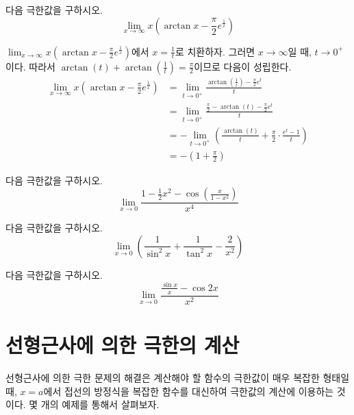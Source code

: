 \documentclass[11pt, a4paper]{book}
\begin{document}
\begin{example}
	 다음 극한값을 구하시오.
	\begin{equation*}
		\displaystyle\lim_{x\to \infty}x\left(\arctan x -\frac{\pi}{2}e^{\frac{1}{x}}\right)
	\end{equation*}
\begin{solution}
	$\displaystyle\lim_{x \to \infty}x\left(\arctan x -\frac{\pi}{2}e^{\frac{1}{x}}\right)$에서 $x =\frac{1}{t}$로 치환하자. 그러면 $x \to \infty$일 때, $t \to 0^{+}$이다. 따라서 $\arctan(t)+\arctan\left(\frac{1}{t}\right)=\frac{\pi}{2}$이므로 다음이 성립한다.
	\begin{align*}
		\displaystyle\lim_{x\rightarrow\infty}x\left(\arctan x -\frac{\pi}{2}e^{\frac{1}{x}}\right)
		& =\displaystyle\lim_{t\rightarrow 0^{+}}\frac{\arctan\left(\frac{1}{t}\right)-\frac{\pi}{2}e^{t}}{t}\\
		& =\displaystyle\lim_{t\rightarrow 0^{+}}\frac{\frac{\pi}{2}-\arctan(t)-\frac{\pi}{2}e^{t}}{t}\\
		& = -\displaystyle\lim_{t\rightarrow 0^{+}}\left(\frac{\arctan(t)}{t}+\frac{\pi}{2}\cdot\frac{e^{t}-1}{t}\right)\\
		& =-\left(1+\frac{\pi}{2}\right)
	\end{align*}
\end{solution}
\end{example}
\begin{problem}
다음 극한값을 구하시오.
	\begin{equation*}
		\displaystyle\lim_{x\rightarrow 0}\frac{1-\frac{1}{2}x^{2}-\cos\left(\frac{x}{1-x^{2}}\right)}{x^{4}}
	\end{equation*}
\end{problem}
\vspace{1em}
\begin{problem}
	다음 극한값을 구하시오.
	\begin{equation*}
	\displaystyle\lim_{x\rightarrow 0}\left(\frac{1}{\sin^{2}x}+\frac{1}{\tan^{2}x}-\frac{2}{x^{2}}\right)
	\end{equation*}
\end{problem}
\vspace{1em}
\begin{problem}
	다음 극한값을 구하시오.
	\begin{equation*}
		\lim\limits_{x \to 0}\frac{\frac{\sin x}{x}- \cos 2x}{x^2}
	\end{equation*}
\end{problem}
\vspace{1em}
\section{선형근사에 의한 극한의 계산}
선형근사에 의한 극한 문제의 해결은 계산해야 할 함수의 극한값이 매우 복잡한 형태일 때, $x=a$에서 접선의 방정식을 복잡한 함수를 대신하여 극한값의 계산에 이용하는 것이다. 몇 개의 예제를 통해서 살펴보자.
\end{document}
